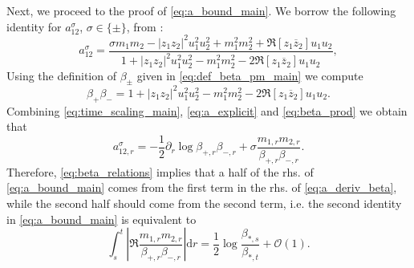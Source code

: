 \documentclass[10pt]{amsart}
\numberwithin{equation}{section}
\newcommand{\dif}{\mathrm{d}}
\begin{document}
Next, we proceed to the proof of \eqref{eq:a_bound_main}. We borrow the following identity for $a_{12}^\sigma$, $\sigma\in\{\pm\}$, from \cite[Eq.(A.13)-(A.14)]{univ_extr}:
\begin{equation}
a_{12}^\sigma = \frac{\sigma m_1m_2 -|z_1z_2|^2u_1^2u_2^2 +m_1^2m_2^2 +\Re [z_1\overline{z}_2]u_1u_2}{1+|z_1z_2|^2u_1^2u_2^2 -m_1^2m_2^2 -2\Re [z_1\overline{z}_2]u_1u_2},
\label{eq:a_explicit}
\end{equation}
Using the definition of $\beta_\pm$ given in \eqref{eq:def_beta_pm_main} we compute
\begin{equation}
\beta_+\beta_- = 1+|z_1z_2|^2u_1^2u_2^2 -m_1^2m_2^2 -2\Re [z_1\overline{z}_2]u_1u_2.
\label{eq:beta_prod}
\end{equation}
Combining \eqref{eq:time_scaling_main}, \eqref{eq:a_explicit} and \eqref{eq:beta_prod} we obtain that
\begin{equation}
a_{12,r}^\sigma= -\frac{1}{2}\partial_r \log \beta_{+,r}\beta_{-,r} + \sigma \frac{m_{1,r}m_{2,r}}{\beta_{+,r}\beta_{-,r}}.
\label{eq:a_deriv_beta}
\end{equation}
Therefore, \eqref{eq:beta_relations} implies that a half of the rhs. of \eqref{eq:a_bound_main} comes from the first term in the rhs. of \eqref{eq:a_deriv_beta}, while the second half should come from the second term, i.e. the second identity in \eqref{eq:a_bound_main} is equivalent to
\begin{equation}
\int_s^t \left\vert \Re \frac{m_{1,r}m_{2,r}}{\beta_{+,r}\beta_{-,r}}\right\vert\dif r = \frac{1}{2}\log \frac{\beta_{*,s}}{\beta_{*,t}} + \mathcal{O}(1).
\label{eq:m_over_beta_bound1}
\end{equation}
\end{document}
